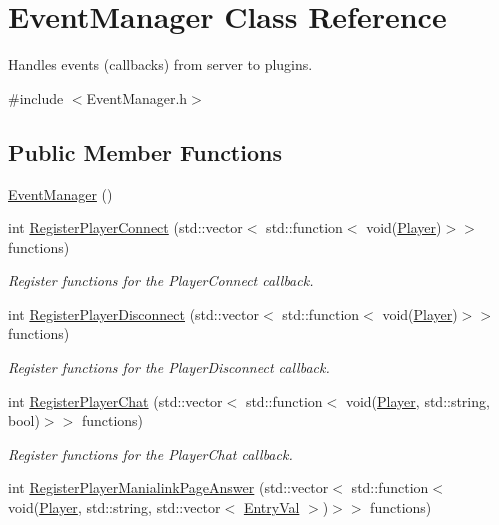 \hypertarget{classEventManager}{\section{Event\-Manager Class Reference}
\label{classEventManager}
}


Handles events (callbacks) from server to plugins.  




{\ttfamily \#include $<$Event\-Manager.\-h$>$}

\subsection*{Public Member Functions}
\begin{DoxyCompactItemize}
\item 
\hyperlink{classEventManager_a89099b22114f158b5c530edfea52371d}{Event\-Manager} ()
\item 
int \hyperlink{classEventManager_a26aec3d9c2cfbdcb62c0f8e432c2fcae}{Register\-Player\-Connect} (std\-::vector$<$ std\-::function$<$ void(\hyperlink{structPlayer}{Player})$>$$>$ functions)
\begin{DoxyCompactList}\small\item\em Register functions for the Player\-Connect callback. \end{DoxyCompactList}\item 
int \hyperlink{classEventManager_a56ed11f893eb5beebfbf294a196005e5}{Register\-Player\-Disconnect} (std\-::vector$<$ std\-::function$<$ void(\hyperlink{structPlayer}{Player})$>$$>$ functions)
\begin{DoxyCompactList}\small\item\em Register functions for the Player\-Disconnect callback. \end{DoxyCompactList}\item 
int \hyperlink{classEventManager_a42b05790b31a3c4cdbecd3f77a2e5cf0}{Register\-Player\-Chat} (std\-::vector$<$ std\-::function$<$ void(\hyperlink{structPlayer}{Player}, std\-::string, bool)$>$$>$ functions)
\begin{DoxyCompactList}\small\item\em Register functions for the Player\-Chat callback. \end{DoxyCompactList}\item 
int \hyperlink{classEventManager_a5213c8526941c4a67b08d080302dc6bc}{Register\-Player\-Manialink\-Page\-Answer} (std\-::vector$<$ std\-::function$<$ void(\hyperlink{structPlayer}{Player}, std\-::string, std\-::vector$<$ \hyperlink{structEntryVal}{Entry\-Val} $>$)$>$$>$ functions)

\end{DoxyCompactItemize}

